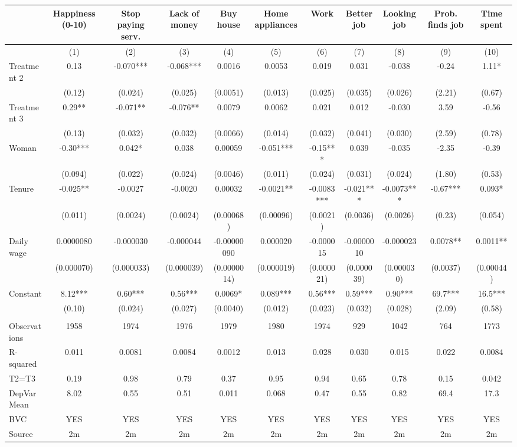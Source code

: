 \begin{tabular}{lcccccccccc}
\toprule
      & Happiness (0-10) & Stop paying serv. & Lack of money & Buy house & Home appliances & Work  & Better job & Looking job & Prob. finds job & Time spent \\
\midrule
\midrule
      & (1)   & (2)   & (3)   & (4)   & (5)   & (6)   & (7)   & (8)   & (9)   & (10) \\
\midrule
\midrule
Treatment 2 & 0.13  & -0.070*** & -0.068*** & 0.0016 & 0.0053 & 0.019 & 0.031 & -0.038 & -0.24 & 1.11* \\
      & (0.12) & (0.024) & (0.025) & (0.0051) & (0.013) & (0.025) & (0.035) & (0.026) & (2.21) & (0.67) \\
Treatment 3 & 0.29** & -0.071** & -0.076** & 0.0079 & 0.0062 & 0.021 & 0.012 & -0.030 & 3.59  & -0.56 \\
      & (0.13) & (0.032) & (0.032) & (0.0066) & (0.014) & (0.032) & (0.041) & (0.030) & (2.59) & (0.78) \\
Woman & -0.30*** & 0.042* & 0.038 & 0.00059 & -0.051*** & -0.15*** & 0.039 & -0.035 & -2.35 & -0.39 \\
      & (0.094) & (0.022) & (0.024) & (0.0046) & (0.011) & (0.024) & (0.031) & (0.024) & (1.80) & (0.53) \\
Tenure & -0.025** & -0.0027 & -0.0020 & 0.00032 & -0.0021** & -0.0083*** & -0.021*** & -0.0073*** & -0.67*** & 0.093* \\
      & (0.011) & (0.0024) & (0.0024) & (0.00068) & (0.00096) & (0.0021) & (0.0036) & (0.0026) & (0.23) & (0.054) \\
Daily wage & 0.0000080 & -0.000030 & -0.000044 & -0.00000090 & 0.000020 & -0.000015 & -0.0000010 & -0.000023 & 0.0078** & 0.0011** \\
      & (0.000070) & (0.000033) & (0.000039) & (0.0000014) & (0.000019) & (0.000021) & (0.000039) & (0.000030) & (0.0037) & (0.00044) \\
Constant & 8.12*** & 0.60*** & 0.56*** & 0.0069* & 0.089*** & 0.56*** & 0.59*** & 0.90*** & 69.7*** & 16.5*** \\
      & (0.10) & (0.024) & (0.027) & (0.0040) & (0.012) & (0.023) & (0.032) & (0.028) & (2.09) & (0.58) \\
      &       &       &       &       &       &       &       &       &       &  \\
\midrule
Observations & 1958  & 1974  & 1976  & 1979  & 1980  & 1974  & 929   & 1042  & 764   & 1773 \\
R-squared & 0.011 & 0.0081 & 0.0084 & 0.0012 & 0.013 & 0.028 & 0.030 & 0.015 & 0.022 & 0.0084 \\
T2=T3 & 0.19  & 0.98  & 0.79  & 0.37  & 0.95  & 0.94  & 0.65  & 0.78  & 0.15  & 0.042 \\
DepVarMean & 8.02  & 0.55  & 0.51  & 0.011 & 0.068 & 0.47  & 0.55  & 0.82  & 69.4  & 17.3 \\
BVC   & YES   & YES   & YES   & YES   & YES   & YES   & YES   & YES   & YES   & YES \\
Source & 2m    & 2m    & 2m    & 2m    & 2m    & 2m    & 2m    & 2m    & 2m    & 2m \\
\bottomrule
\bottomrule
\end{tabular}%
